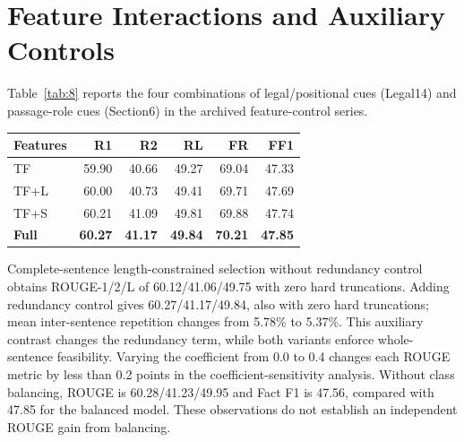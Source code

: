 \documentclass[10pt,twocolumn,letterpaper]{article}
\begin{document}
\par\medskip\noindent\begin{minipage}{\columnwidth}
\section{Feature Interactions and Auxiliary Controls}\label{appendix-d-feature-interactions-and-auxiliary-controls}

Table~\ref{tab:8} reports the four combinations of legal/positional cues (Legal14) and passage-role cues (Section6) in the archived feature-control series.

\label{tab:8}
\begin{tabular*}{\columnwidth}{@{\extracolsep{\fill}}lrrrrr@{}}
\toprule
\textbf{Features} & \textbf{R1} & \textbf{R2} & \textbf{RL} & \textbf{FR} & \textbf{FF1} \\
\midrule
TF & 59.90 & 40.66 & 49.27 & 69.04 & 47.33 \\
TF+L & 60.00 & 40.73 & 49.41 & 69.71 & 47.69 \\
TF+S & 60.21 & 41.09 & 49.81 & 69.88 & 47.74 \\
\textbf{Full} & \textbf{60.27} & \textbf{41.17} & \textbf{49.84} & \textbf{70.21} & \textbf{47.85} \\
\bottomrule
\end{tabular*}
\end{minipage}\par\smallskip

Complete-sentence length-constrained selection without redundancy control obtains ROUGE-1/2/L of 60.12/41.06/49.75 with zero hard truncations. Adding redundancy control gives 60.27/41.17/49.84, also with zero hard truncations; mean inter-sentence repetition changes from 5.78\% to 5.37\%. This auxiliary contrast changes the redundancy term, while both variants enforce whole-sentence feasibility. Varying the coefficient from 0.0 to 0.4 changes each ROUGE metric by less than 0.2 points in the coefficient-sensitivity analysis. Without class balancing, ROUGE is 60.28/41.23/49.95 and Fact F1 is 47.56, compared with 47.85 for the balanced model. These observations do not establish an independent ROUGE gain from balancing.
\end{document}
